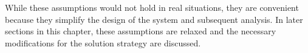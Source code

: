 While these assumptions would not hold in real situations, they are convenient because they simplify the design of the system and subsequent analysis. In later sections in this chapter, these assumptions are relaxed and the necessary modifications for the solution strategy are discussed. 
